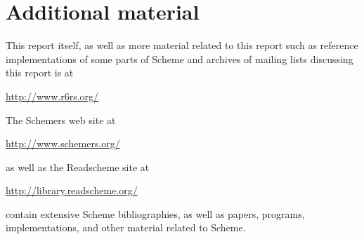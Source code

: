 \chapter{Additional material}

This report itself, as well as more material related to this report
such as reference implementations of some parts of Scheme and archives of
mailing lists discussing this report is at
\begin{center}
\url{http://www.r6rs.org/}
\end{center}

The Schemers web site at
\begin{center}
\url{http://www.schemers.org/}
\end{center}
as well as the Readscheme site at
\begin{center}
\url{http://library.readscheme.org/}
\end{center}
contain extensive Scheme bibliographies, as well as papers,
programs, implementations, and other material related to Scheme.


